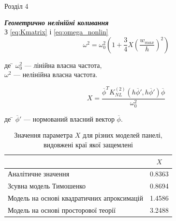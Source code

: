 \documentclass[handout, 8pt]{beamer}
\numberwithin{figure}{section}
\numberwithin{equation}{section}
\numberwithin{table}{section}
\begin{document}
\begin{frame}{Розділ 4}

\textbf{\textit{Геометрично нелінійні коливання}}
\\
\vspace{1em}
З \eqref{eq:Kmatrix} і \eqref{eq:omega_nonlin}
\begin{equation}
\omega^2=\omega_0^2\left(1+\frac{3}{4}X\left(\frac{w_{max}}{h}\right)^2\right)
\end{equation}

\begin{tabbing}
де \= $\omega_0^2$ --- лінійна власна частота,\\
\> $\omega^2$ --- нелінійна власна частота.
\end{tabbing}

\begin{equation}
X=\frac{\overline{\phi}^T K_{NL}^{(2)}\left( h\overline{\phi}',h\overline{\phi}' \right) \overline{\phi}}{\omega_0^2}
\end{equation}

\begin{tabbing}
де \= $\overline{\phi}'$ --- нормований власний вектор $\overline{\phi}$.
\end{tabbing}


%
\begin{table}[h!]
\caption{Значення параметра $X$ для різних моделей панелі, видовжені краї якої защемлені}
\centering
 \begin{tabular}{| l | c |} 
 \hline
 & $X$ \\ 
 \hline
 Аналітичне значення\footnotemark & 0.8363 \\ 
 \hline
 Зсувна модель Тимошенко & 0.8694 \\ 
 \hline
 Модель на основі квадратичних апроксимацій & 1.4586 \\ 
 \hline
 Модель на основі просторової теорії & 3.2488 \\
 \hline
\end{tabular}
\end{table}



\end{frame}
\end{document}
